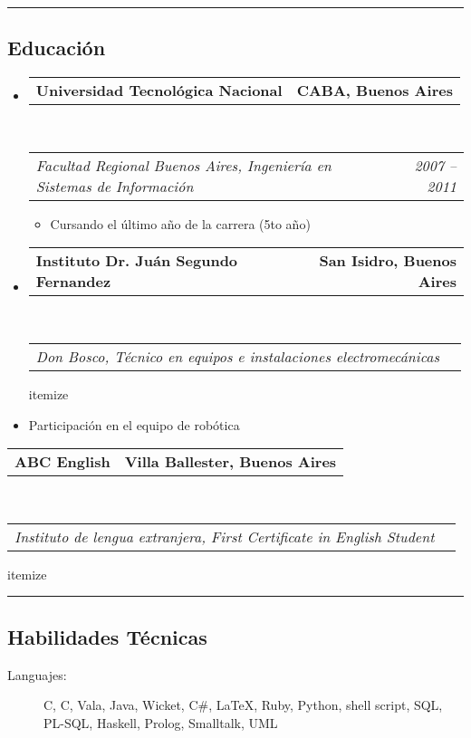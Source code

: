 \documentclass[11pt,4apaper]{article}
\makeatletter
\newenvironment{indentsection}[1]%
{\begin{list}{}%
    {\setlength{\leftmargin}{#1}}%
    \item[]%
}
{\end{list}}
\newcommand{\headerrow}[2]
{\begin{tabular*}{\linewidth}{l@{\extracolsep{\fill}}r}
#1 &
#2 \\
    \end{tabular*}}
\newcommand{\CPP}
{C\nolinebreak[4]\hspace{-.05em}\raisebox{.22ex}{\footnotesize\bf ++}}
\makeatother
\begin{document}
    \hrule
    \vspace{-0.4em}
    \subsection*{Educación}

    \begin{itemize}
    \parskip=0.1em

    \item 
    \headerrow
{\textbf{Universidad Tecnológica Nacional}}
{\textbf{CABA, Buenos Aires}}
\\
        \headerrow
{\emph{Facultad Regional Buenos Aires, Ingeniería en
    Sistemas de Información}} 
{\emph{2007 -- 2011}}
\begin{itemize}
\item Cursando el último año de la carrera (5to año)
    \end{itemize}


    \item 
    \headerrow
{\textbf{Instituto Dr. Juán Segundo Fernandez}}
{\textbf{San Isidro, Buenos Aires}}
\\
        \headerrow
{\emph{Don Bosco, Técnico en equipos e instalaciones electromecánicas}} 

\begin{itemize}
\item Participación en el equipo de robótica
\end{itemize}

\item 
\headerrow
{\textbf{ABC English}}
{\textbf{Villa Ballester, Buenos Aires}}
\\
        \headerrow
{\emph{Instituto de lengua extranjera, First Certificate in English Student}}


\end{itemize}


\hrule
\vspace{-0.4em}
\subsection*{Habilidades Técnicas}

\begin{indentsection}{\parindent}
\begin{description}
\item[Languajes:]
C, \CPP, Vala, Java, Wicket, C{\#}, \LaTeX, Ruby, Python, shell script, SQL,
    PL-SQL, Haskell, Prolog, Smalltalk, UML
    \end{description}
    \end{indentsection}

    
\end{document}
